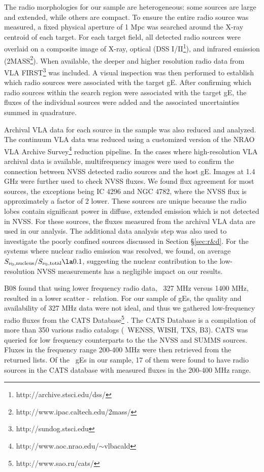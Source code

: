 \documentclass{emulateapj}
\begin{document}
The radio morphologies for our sample are heterogeneous: some sources
are large and extended, while others are compact. To ensure the entire
radio source was measured, a fixed physical aperture of 1 Mpc was
searched around the X-ray centroid of each target. For each target
field, all detected radio sources were overlaid on a composite image
of X-ray, optical (DSS I/II\footnote{http://archive.stsci.edu/dss/}),
and infrared emission
(2MASS\footnote{http://www.ipac.caltech.edu/2mass/}). When available,
the deeper and higher resolution radio data from VLA
FIRST\footnote{http://sundog.stsci.edu} was included. A visual
inspection was then performed to establish which radio sources were
associated with the target gE. After confirming which radio sources
within the search region were associated with the target gE, the
fluxes of the individual sources were added and the associated
uncertainties summed in quadrature.

Archival VLA data for each source in the sample was also reduced and
analyzed. The continuum VLA data was reduced using a customized
version of the NRAO VLA Archive
Survey\footnote{http://www.aoc.nrao.edu/$\sim$vlbacald} reduction
pipeline. In the cases where high-resolution VLA archival data is
available, multifrequency images were used to confirm the connection
between NVSS detected radio sources and the host gE. Images at 1.4 GHz
were further used to check NVSS fluxes. We found flux agreement for
most sources, the exceptions being IC 4296 and NGC 4782, where the
NVSS flux is approximately a factor of 2 lower. These sources are
unique because the radio lobes contain significant power in diffuse,
extended emission which is not detected in NVSS. For these sources,
the fluxes measured from the archival VLA data are used in our
analysis. The additional data analysis step was also used to
investigate the poorly confined sources discussed in Section
\S\ref{sec:r&d}. For the systems where nuclear radio emission was
resolved, we found, on average $S_{\nu_0,\mathrm{nucleus}} /
S_{\nu_0,\mathrm{total}} \la 0.1$, suggesting the nuclear contribution
to the low-resolution NVSS measurements has a negligible impact on our
results.

B08 found that using lower frequency radio data, \ie\ 327 MHz versus
1400 MHz, resulted in a lower scatter \pjet-\prad\ relation. For our
sample of gEs, the quality and availability of 327 MHz data were not
ideal, and thus we gathered low-frequency radio fluxes from the CATS
Database\footnote{http://www.sao.ru/cats/} \citep{cats}. The CATS
Database is a compilation of more than 350 various radio catalogs
(\eg\ WENSS, WISH, TXS, B3). CATS was queried for low frequency
counterparts to the the NVSS and SUMMS sources. Fluxes in the
frequency range 200-400 MHz were then retrieved from the returned
lists. Of the \samp\ gEs in our sample, 17 of them were found to have
radio sources in the CATS database with measured fluxes in the 200-400
MHz range.
\end{document}
